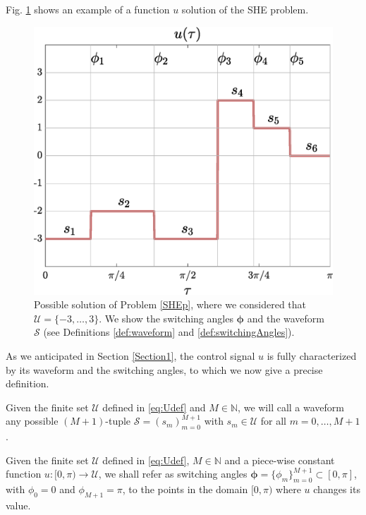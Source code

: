 Fig. \ref{fig:exampleSHE} shows an example of a function $u$ solution of the SHE problem. 

\begin{figure}
	\centering
	\includegraphics[scale=0.35]{img/fig01.eps} 
	\caption{Possible solution of Problem \ref{SHEp}, where we considered that $\mathcal{U} = \{-3,\dots,3\}$. We show the switching angles $\bm{\phi}$ and the waveform $\mathcal{S}$ (see Definitions \ref{def:waveform} and \ref{def:switchingAngles}).}\label{fig:exampleSHE}
\end{figure}

As we anticipated in Section \ref{Section1}, the control signal $u$ is fully characterized by its waveform and the switching angles, to which we now give a precise definition.
\newline
\begin{definition}\label{def:waveform}
Given the finite set $\mathcal U$ defined in \eqref{eq:Udef} and $M\in\mathbb{N}$, we will call a waveform any possible $(M+1)$-tuple $\mathcal S = (s_m)_{m=0}^{M+1}$ with $s_m\in \mathcal U$ for all $m=0,\ldots,M+1$.
\end{definition}
 
\begin{definition}\label{def:switchingAngles}
Given the finite set $\mathcal U$ defined in \eqref{eq:Udef}, $M\in\mathbb{N}$ and a piece-wise constant function $u:[0,\pi) \rightarrow \mathcal{U}$, we shall refer as switching angles $\bm{\phi} = \{\phi_m\}_{m=0}^{M+1}\subset[0,\pi]$, with $\phi_0 = 0$ and $\phi_{M+1} = \pi$, to the points in the domain $[0,\pi)$ where $u$ changes its value. 
\end{definition}

